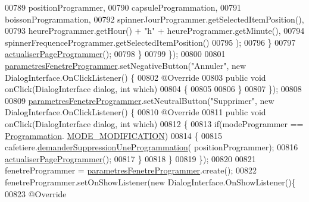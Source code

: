 \begin{DoxyCode}
00789                             positionProgrammer,
00790                             capsuleProgrammation,
00791                             boissonProgrammation,
00792                             spinnerJourProgrammer.getSelectedItemPosition(),
00793                             heureProgrammer.getHour() + \textcolor{stringliteral}{"h"} + heureProgrammer.getMinute(),
00794                             spinnerFrequenceProgrammer.getSelectedItemPosition()
00795                     );
00796                 \}
00797                 \hyperlink{classcom_1_1example_1_1ekawa_1_1_ihm_adbeeac61b5a53c52d21da490659de983}{actualiserPageProgrammer}();
00798             \}
00799         \});
00800 
00801         \hyperlink{classcom_1_1example_1_1ekawa_1_1_ihm_a6eb2afb2fe8da7f3a749089c84934145}{parametresFenetreProgrammer}.setNegativeButton(\textcolor{stringliteral}{"Annuler"}, \textcolor{keyword}{new} 
      DialogInterface.OnClickListener() \{
00802             @Override
00803             \textcolor{keyword}{public} \textcolor{keywordtype}{void} onClick(DialogInterface dialog, \textcolor{keywordtype}{int} which)
00804             \{
00805 
00806             \}
00807         \});
00808 
00809         \hyperlink{classcom_1_1example_1_1ekawa_1_1_ihm_a6eb2afb2fe8da7f3a749089c84934145}{parametresFenetreProgrammer}.setNeutralButton(\textcolor{stringliteral}{"Supprimer"}, \textcolor{keyword}{new} 
      DialogInterface.OnClickListener() \{
00810             @Override
00811             \textcolor{keyword}{public} \textcolor{keywordtype}{void} onClick(DialogInterface dialog, \textcolor{keywordtype}{int} which)
00812             \{
00813                 \textcolor{keywordflow}{if}(modeProgrammer == \hyperlink{classcom_1_1example_1_1ekawa_1_1_programmation}{Programmation}.
      \hyperlink{classcom_1_1example_1_1ekawa_1_1_programmation_a33fb0a465e66ba5854a07e3050c12c04}{MODE\_MODIFICATION})
00814                 \{
00815                     cafetiere.\hyperlink{classcom_1_1example_1_1ekawa_1_1_cafetiere_a0af9bf8f80c745c7919ea3efdc2183d0}{demanderSuppressionUneProgrammation}(
      positionProgrammer);
00816                     \hyperlink{classcom_1_1example_1_1ekawa_1_1_ihm_adbeeac61b5a53c52d21da490659de983}{actualiserPageProgrammer}();
00817                 \}
00818             \}
00819         \});
00820 
00821         fenetreProgrammer = \hyperlink{classcom_1_1example_1_1ekawa_1_1_ihm_a6eb2afb2fe8da7f3a749089c84934145}{parametresFenetreProgrammer}.create();
00822         fenetreProgrammer.setOnShowListener(\textcolor{keyword}{new} DialogInterface.OnShowListener()\{
00823             @Override

\end{DoxyCode}
